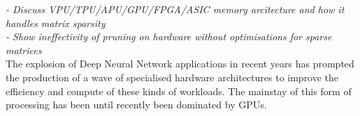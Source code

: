 \documentclass[../../D1.tex]{subfiles}
\begin{document}
\emph{
- Discuss VPU/TPU/APU/GPU/FPGA/ASIC memory arcitecture and how it handles matrix sparsity\\
- Show ineffectivity of pruning on hardware without optimisations for sparse matrices\\
}
The explosion of Deep Neural Network applications in recent years has prompted the production of a wave of specialised hardware architectures to improve the efficiency and compute of these kinds of workloads. The mainstay of this form of processing has been until recently been dominated by GPUs.\\
\end{document}
